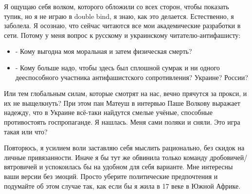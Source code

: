 Я ощущаю себя волком, которого обложили со всех сторон, чтобы показать тупик,
но я не играю в double bind, я знаю, как это делается. Естественно, я заболела.
Я осознаю, что сейчас читаются все мои академические разработки в сети. Потому
у меня вопрос к русскому и украинскому читателю-антифашисту:

\begin{itemize}
\item - Кому выгодна моя моральная и затем физическая смерть? 
\item - Кому больше надо, чтобы здесь был сплошной сумрак и ни одного дееспособного
участника антифашистского сопротивления? Украине? России? 
\end{itemize}

Или тем глобальным силам, которые смотрят на нас, вечно прячутся за прокси, и
их не выщелкнуть? При этом пан Матеуш в интервью Паше Волкову выражает надежду,
что в Украине всё-таки найдутся смелые учёные, способные противостоять
госпропаганде. Я нашлась. Меня сами поляки и сняли. Это игра такая или что?

Повторюсь, я усилием воли заставляю себя мыслить рационально, без скидок на
личные привязанности. Иначе я бы тут же обвинила только команду
дробовичей/вятровичей и успокоилась бы на удобном для себя варианте. Мне
интересны ваши версии без эмоций. Просто уберите политические предпочтения и
подумайте об этом случае так, как если бы я жила в 17 веке в Южной Африке.
